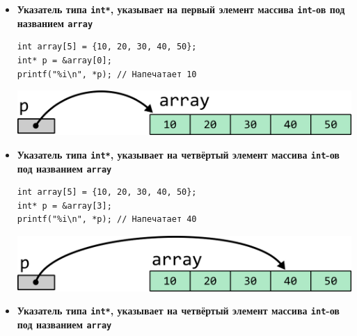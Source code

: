\documentclass[10pt]{article}
\begin{document}
\begin{itemize}
\item \textbf{Указатель типа \texttt{int*}, указывает на первый элемент массива \texttt{int}-ов под названием \texttt{array}}\\

\begin{minipage}{0.5\linewidth}
\begin{lstlisting}
int array[5] = {10, 20, 30, 40, 50};
int* p = &array[0];
printf("%i\n", *p); // Напечатает 10
\end{lstlisting}
\end{minipage}
\begin{minipage}{0.45\linewidth}
\begin{center}
\includegraphics[scale=1]{../images/pointer_tasks/pointer_task_array.png}
\end{center}
\end{minipage}
\vspace{0.5cm}


\item \textbf{Указатель типа \texttt{int*}, указывает на четвёртый элемент массива \texttt{int}-ов под названием \texttt{array}}\\

\begin{minipage}{0.5\linewidth}
\begin{lstlisting}
int array[5] = {10, 20, 30, 40, 50};
int* p = &array[3];
printf("%i\n", *p); // Напечатает 40
\end{lstlisting}
\end{minipage}
\begin{minipage}{0.45\linewidth}
\begin{center}
\includegraphics[scale=1]{../images/pointer_tasks/pointer_task_array_4.png}
\end{center}
\end{minipage}
\vspace{0.5cm}

\item \textbf{Указатель типа \texttt{int*}, указывает на четвёртый элемент массива \texttt{int}-ов под названием \texttt{array}}\\


\end{itemize}
\end{document}
